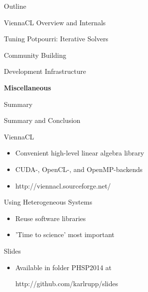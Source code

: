 \begin{frame}{Outline}
 \begin{block}{ViennaCL Overview and Internals}\end{block}
 \begin{block}{Tuning Potpourri: Iterative Solvers}\end{block}
 \begin{block}{Community Building}\end{block}
 \begin{block}{Development Infrastructure}\end{block}
 \begin{block}{\textbf{Miscellaneous}}\end{block}
 \begin{block}{Summary}\end{block}
\end{frame}










%
%
\begin{frame}{Summary and Conclusion}

  \begin{block}{ViennaCL}
   \begin{itemize}
    \item Convenient high-level linear algebra library
    \item CUDA-, OpenCL-, and OpenMP-backends
    \item 
     \begin{center}
      \Large http://viennacl.sourceforge.net/
     \end{center}
   \end{itemize}
  \end{block}

  \begin{block}{Using Heterogeneous Systems}
   \begin{itemize}
    \item Reuse software libraries
    \item 'Time to science' most important
   \end{itemize}
  \end{block}
  
  \begin{block}{Slides}
    \begin{itemize}
     \item Available in folder PHSP2014 at
     \begin{center}
      \Large http://github.com/karlrupp/slides
     \end{center}
    \end{itemize}
  \end{block}

\end{frame}


